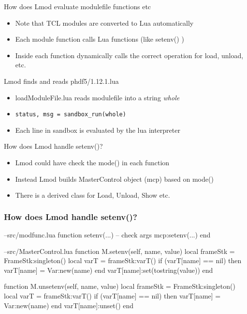 \documentclass{beamer}
\begin{document}
\begin{frame}{How does Lmod evaluate modulefile functions etc}
  \begin{itemize}
    \item Note that TCL modules are converted to Lua automatically
    \item Each module function calls Lua functions (like setenv() )
    \item Inside each function dynamically calls the correct operation
      for load, unload, etc.
  \end{itemize}
\end{frame}

\begin{frame}{Lmod finds and reads phdf5/1.12.1.lua}
  \begin{itemize}
    \item loadModuleFile.lua reads modulefile into a string \emph{whole}
    \item \texttt{status, msg = sandbox\_run(whole)}
    \item Each line in sandbox is evaluated by the lua interpreter
  \end{itemize}
\end{frame}

\begin{frame}{How does Lmod handle setenv()?}
  \begin{itemize}
    \item Lmod could have check the mode() in each function
    \item Instead Lmod builds MasterControl object (mcp) based on mode()
    \item There is a derived class for Load, Unload, Show etc.
  \end{itemize}
\end{frame}

\begin{frame}[fragile]
  \frametitle{How does Lmod handle setenv()?}
    {\tiny
\begin{semiverbatim}
--src/modfunc.lua
function setenv(...)
    -- check args
    mcp:setenv(...)
end

--src/MasterControl.lua
function M.setenv(self, name, value)
   local frameStk = FrameStk:singleton()
   local varT     = frameStk:varT()
   if (varT[name] == nil) then
      varT[name] = Var:new(name)
   end
   varT[name]:set(tostring(value))
end

function M.unsetenv(self, name, value)
   local frameStk  = FrameStk:singleton()
   local varT      = frameStk:varT()
   if (varT[name] == nil) then
      varT[name]   = Var:new(name)
   end
   varT[name]:unset()
end
\end{semiverbatim}
    }
\end{frame}
\end{document}
